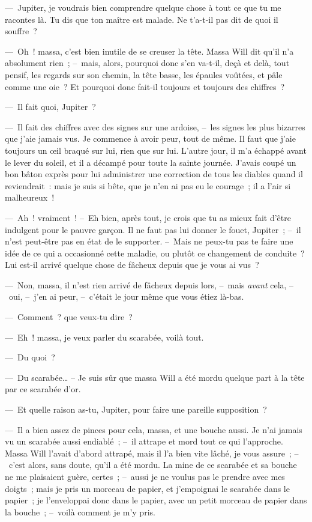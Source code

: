 \documentclass[french,twoside]{book} %
\begin{document}
— Jupiter, je voudrais bien comprendre quelque chose à tout ce que tu me racontes là. Tu dis que ton maître est malade. Ne t’a-t-il pas dit de quoi il souffre ?\par
— Oh ! massa, c’est bien inutile de se creuser la tête. Massa Will dit qu’il n’a absolument rien ; – mais, alors, pourquoi donc s’en va-t-il, deçà et delà, tout pensif, les regards sur son chemin, la tête basse, les épaules voûtées, et pâle comme une oie ? Et pourquoi donc fait-il toujours et toujours des chiffres ?\par
— Il fait quoi, Jupiter ?\par
— Il fait des chiffres avec des signes sur une ardoise, – les signes les plus bizarres que j’aie jamais vus. Je commence à avoir peur, tout de même. Il faut que j’aie toujours un œil braqué sur lui, rien que sur lui. L’autre jour, il m’a échappé avant le lever du soleil, et il a décampé pour toute la sainte journée. J’avais coupé un bon bâton exprès pour lui administrer une correction de tous les diables quand il reviendrait : mais je suis si bête, que je n’en ai pas eu le courage ; il a l’air si malheureux !\par
— Ah ! vraiment ! – Eh bien, après tout, je crois que tu as mieux fait d’être indulgent pour le pauvre garçon. Il ne faut pas lui donner le fouet, Jupiter ; – il n’est peut-être pas en état de le supporter. – Mais ne peux-tu pas te faire une idée de ce qui a occasionné cette maladie, ou plutôt ce changement de conduite ? Lui est-il arrivé quelque chose de fâcheux depuis que je vous ai vus ?\par
— Non, massa, il n’est rien arrivé de fâcheux depuis lors, – mais\emph{ avant} cela, – oui, – j’en ai peur, – c’était le jour même que vous étiez là-bas.\par
— Comment ? que veux-tu dire ?\par
— Eh ! massa, je veux parler du scarabée, voilà tout.\par
— Du quoi ?\par
— Du scarabée… – Je suis sûr que massa Will a été mordu quelque part à la tête par ce scarabée d’or.\par
— Et quelle raison as-tu, Jupiter, pour faire une pareille supposition ?\par
— Il a bien assez de pinces pour cela, massa, et une bouche aussi. Je n’ai jamais vu un scarabée aussi endiablé ; – il attrape et mord tout ce qui l’approche. Massa Will l’avait d’abord attrapé, mais il l’a bien vite lâché, je vous assure ; – c’est alors, sans doute, qu’il a été mordu. La mine de ce scarabée et sa bouche ne me plaisaient guère, certes ; – aussi je ne voulus pas le prendre avec mes doigts ; mais je pris un morceau de papier, et j’empoignai le scarabée dans le papier ; je l’enveloppai donc dans le papier, avec un petit morceau de papier dans la bouche ; – voilà comment je m’y pris.\par
\end{document}
